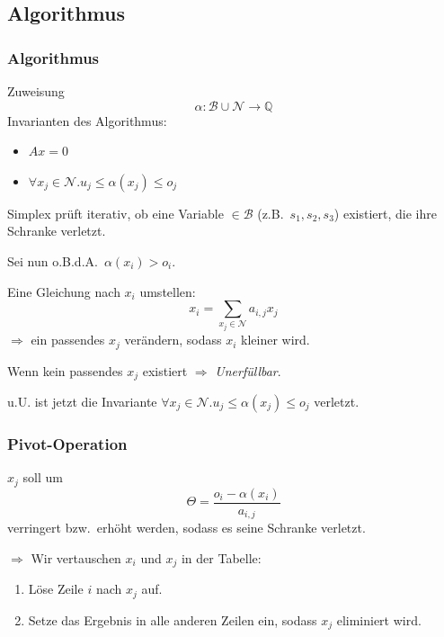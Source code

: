 \documentclass[hyperref={pdfpagelabels=false}]{beamer}
\newcommand{\IQ}{\mathds{Q}}
\begin{document}
\subsection{Algorithmus}
\begin{frame}
	\frametitle{Algorithmus}
	Zuweisung
	\[ \alpha : \mathcal{B} \cup \mathcal{N} \rightarrow \IQ \]
	Invarianten des Algorithmus:
	\begin{itemize}
		\item $Ax = 0$
		\item $\forall x_j \in \mathcal{N} . u_j \leq \alpha(x_j) \leq o_j$
	\end{itemize}
	Simplex prüft iterativ, ob eine Variable $\in \mathcal{B}$ (z.B.\ $s_1, s_2, s_3$) existiert, die ihre Schranke verletzt.
\end{frame}
\begin{frame}
	Sei nun o.B.d.A.\ $\alpha(x_i) > o_i$.
	
	Eine Gleichung nach $x_i$ umstellen:
	\[ x_i = \sum_{x_j \in \mathcal{N}} a_{i,j} x_j \]
	$\Rightarrow$ ein passendes $x_j$ verändern, sodass $x_i$ kleiner wird. %

	Wenn kein passendes $x_j$ existiert $\Rightarrow$ \emph{Unerfüllbar}.

	u.U. ist jetzt die Invariante $\forall x_j \in \mathcal{N} . u_j \leq \alpha(x_j) \leq o_j$ verletzt.
\end{frame}
\begin{frame}
	\frametitle{Pivot-Operation}
	$x_j$ soll um 
	\[ \Theta = \frac{o_i - \alpha(x_i)}{a_{i,j}} \]
	verringert bzw.\ erhöht werden, sodass es seine Schranke verletzt.

	$\Rightarrow$ Wir vertauschen $x_i$ und $x_j$ in der Tabelle:
	\begin{enumerate}
		\item Löse Zeile $i$ nach $x_j$ auf.
		\item Setze das Ergebnis in alle anderen Zeilen ein, sodass $x_j$ eliminiert wird.
	\end{enumerate}
\end{frame}
\end{document}
